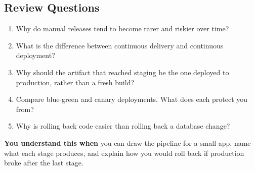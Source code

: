 \subsection*{Review Questions}\label{04-pipelines-from-a-commit-to-production:review-questions}

\begin{enumerate}
\def\labelenumi{\arabic{enumi}.}
\tightlist
\item
  Why do manual releases tend to become rarer and riskier over time?
\item
  What is the difference between continuous delivery and continuous deployment?
\item
  Why should the artifact that reached staging be the one deployed to production, rather than a fresh build?
\item
  Compare blue-green and canary deployments. What does each protect you from?
\item
  Why is rolling back code easier than rolling back a database change?
\end{enumerate}

\begin{understandbox}

\textbf{You understand this when} you can draw the pipeline for a small app, name what each stage produces, and explain how you would roll back if production broke after the last stage.

\end{understandbox}
